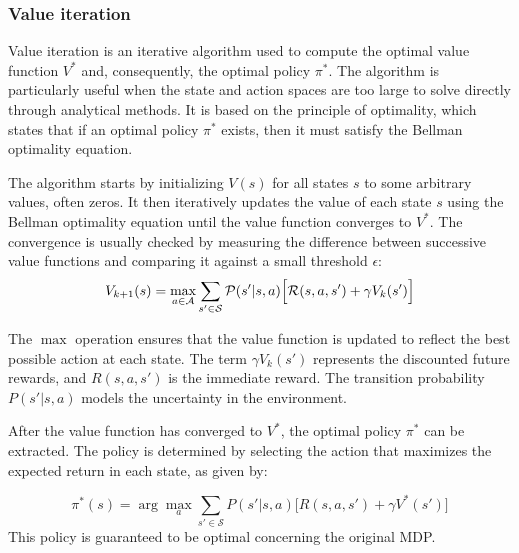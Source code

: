 \subsubsection{Value iteration}
Value iteration is an iterative algorithm used to compute the optimal value function \(V^*\) and,
 consequently, the optimal policy \(\pi^*\). 
 The algorithm is particularly useful when the state and action spaces are too large to solve directly through analytical methods. 
 It is based on the principle of optimality, which states that if an optimal policy \(\pi^*\) exists, then it must satisfy the Bellman optimality equation.

The algorithm starts by initializing \(V(s)\) 
 for all states \(s\) to some arbitrary values, often zeros. 
 It then iteratively updates the value of each state \(s\) 
 using the Bellman optimality equation until the value function converges to \(V^*\). 
 The convergence is usually checked by measuring the difference between successive value functions and comparing it against a small threshold \(\epsilon\):
\begin{equation}
V_{k+1}(s) = \max_{a \in \mathcal{A}} \sum_{s' \in \mathcal{S}} \mathcal{P}(s'|s, a) \Big[ \mathcal{R}(s, a, s') + \gamma V_k(s') \Big]
\end{equation}

The \(\max\) operation ensures that the value function is updated to reflect the best possible action at each state. 
 The term \(\gamma V_k(s')\) represents the discounted future rewards, 
 and \(R(s, a, s')\) is the immediate reward. 
 The transition probability \(P(s'|s, a)\) models the uncertainty in the environment.

After the value function has converged to \(V^*\), 
 the optimal policy \(\pi^*\) can be extracted. 
 The policy is determined by selecting the action that maximizes the expected return in each state, as given by:

\begin{equation}
\pi^*(s) = \arg \max_{a} \sum_{s' \in \mathcal{S}} P(s'|s, a) \Big[ R(s, a, s') + \gamma V^*(s') \Big]
\end{equation}
This policy is guaranteed to be optimal concerning the original MDP.

